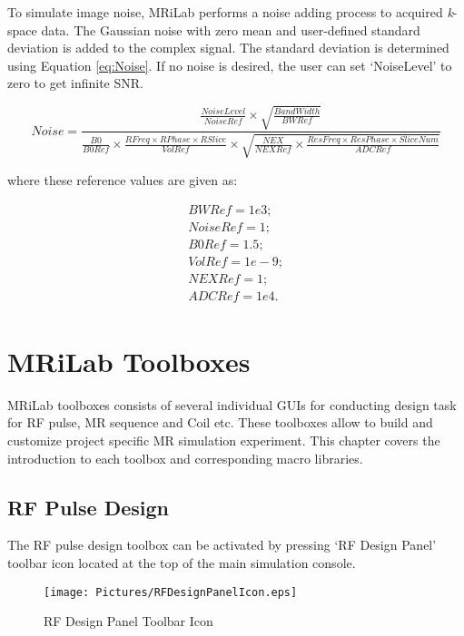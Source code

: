 \documentclass{book}%
\begin{document}
To simulate image noise, MRiLab performs a noise adding process to acquired \textit{k}-space data. The Gaussian noise with zero mean and user-defined standard deviation is added to the complex signal. The standard deviation is determined using Equation \ref{eq:Noise}. If no noise is desired, the user can set `NoiseLevel' to zero to get infinite SNR.

\begin{equation}
Noise = \frac{\frac{NoiseLevel}{NoiseRef} \times \sqrt{\frac{BandWidth}{BWRef}}}{\frac{B0}{B0Ref} \times \frac{RFreq \times RPhase \times RSlice}{VolRef}
				\times \sqrt{\frac{NEX}{NEXRef} \times \frac{ResFreq \times ResPhase \times SliceNum}{ADCRef}}}
\label{eq:Noise}
\end{equation}

where these reference values are given as:

\begin{equation}
\begin{aligned}
	BWRef  = 1e3; \\
	NoiseRef = 1; \\
	B0Ref  = 1.5; \\
  VolRef = 1e-9; \\
	NEXRef = 1; \\
	ADCRef = 1e4. \\
\label{eq:Noise2}
\end{aligned}
\end{equation}

\chapter{MRiLab Toolboxes} \label{chap:MRiLabToolboxes}

MRiLab toolboxes consists of several individual GUIs for conducting design task for RF pulse, MR sequence and Coil etc. These toolboxes allow to build and customize project specific MR simulation experiment. This chapter covers the introduction to each toolbox and corresponding macro libraries.

\section{RF Pulse Design}

The RF pulse design toolbox can be activated by pressing `RF Design Panel' toolbar icon located at the top of the main simulation console.

\begin{figure}[htbp]
	\centering
		\texttt{[image: Pictures/RFDesignPanelIcon.eps]}
	\caption{RF Design Panel Toolbar Icon}
	\label{fig:RFDesignPanelIcon}
\end{figure}
\end{document}
